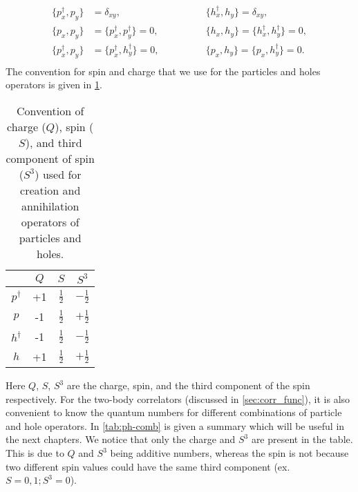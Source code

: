 \begin{equation}
    \begin{aligned}
        \{ p^\dagger_x, p_y \} &= \delta_{xy}, &\{ h^\dagger_x, h_y \} = \delta_{xy},
        \\
        \{ p_x, p_y \} &= \{ p^\dagger_x, p^\dagger_y \} = 0, &\{ h_x, h_y \} = \{ h^\dagger_x, h^\dagger_y \} = 0,
        \\
        \{ p^\dagger_x, p_y \} &= \{ p^\dagger_x, h^\dagger_y \} = 0,\qquad\qquad &\{ p_x, h_y \} = \{ p_x, h^\dagger_y \} = 0.
        \\
    \end{aligned}
\end{equation}
The convention for spin and charge that we use for the particles and holes operators is given in \cref{tab:convention_operators}.
\begin{table}[h]
    \centering
    \begin{tabular}{c|ccc}
        & $Q$ & $S$ & $S^3$ \\
    \hline
        $p^\dagger$ & +1 & $\frac{1}{2}$ & $-\frac{1}{2}$ \\
        $p$ & -1 & $\frac{1}{2}$ & $+\frac{1}{2}$ \\
        $h^\dagger$ & -1 & $\frac{1}{2}$ & $-\frac{1}{2}$ \\
        $h$ & +1 & $\frac{1}{2}$ & $+\frac{1}{2}$ \\
    \end{tabular}
    \caption{Convention of charge ($Q$), spin ($S$), and third component of spin ($S^3$) used for creation and annihilation operators of particles and holes.}
    \label{tab:convention_operators}
\end{table}
Here $Q$, $S$, $S^3$ are the charge, spin, and the third component of the spin respectively. For the two-body correlators (discussed in \cref{sec:corr_func}), it is also convenient to know the quantum numbers for different combinations of particle and hole operators. In \cref{tab:ph-comb} is given a summary which will be useful in the next chapters. We notice that only the charge and $S^3$ are present in the table. This is due to $Q$ and $S^3$ being additive numbers, whereas the spin is not because two different spin values could have the same third component (ex. $S=0,1;S^3=0$).
